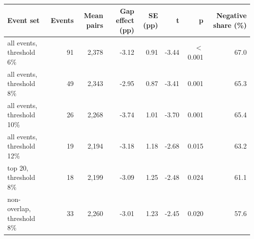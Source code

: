 \begin{tabular}{lrrrrrrr}
\toprule
Event set & Events & Mean pairs & Gap effect (pp) & SE (pp) & t & p & Negative share (\%) \\
\midrule
all events, threshold 6\% & 91 & 2,378 & -3.12 & 0.91 & -3.44 & \ensuremath{<}0.001 & 67.0 \\
all events, threshold 8\% & 49 & 2,343 & -2.95 & 0.87 & -3.41 & 0.001 & 65.3 \\
all events, threshold 10\% & 26 & 2,268 & -3.74 & 1.01 & -3.70 & 0.001 & 65.4 \\
all events, threshold 12\% & 19 & 2,194 & -3.18 & 1.18 & -2.68 & 0.015 & 63.2 \\
top 20, threshold 8\% & 18 & 2,199 & -3.09 & 1.25 & -2.48 & 0.024 & 61.1 \\
non-overlap, threshold 8\% & 33 & 2,260 & -3.01 & 1.23 & -2.45 & 0.020 & 57.6 \\
\bottomrule
\end{tabular}

